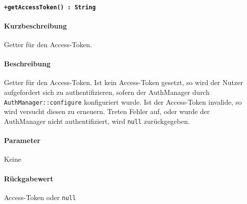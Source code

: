 \paragraph{\texttt{+getAccessToken() : String}}%
\paragraph*{Kurzbeschreibung}
Getter für den Access-Token.
\paragraph*{Beschreibung}
Getter für den Access-Token.
Ist kein Access-Token gesetzt, so wird der Nutzer aufgefordert sich zu authentifizieren, sofern der AuthManager durch \verb#AuthManager::configure# konfiguriert wurde.
Ist der Access-Token invalide, so wird versucht diesen zu erneuern.
Treten Fehler auf, oder wurde der AuthManager nicht authentifiziert, wird \verb#null# zurückgegeben.
\paragraph*{Parameter}
Keine
\paragraph*{Rückgabewert}
Access-Token oder \verb#null#